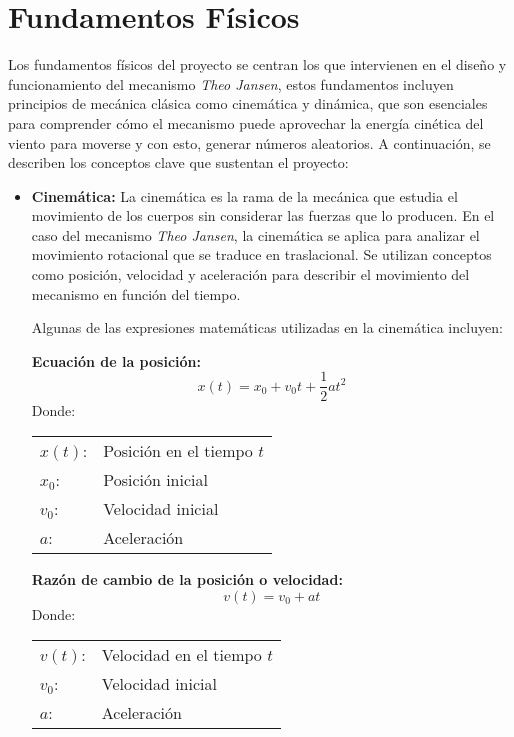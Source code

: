 \section{Fundamentos Físicos}

Los fundamentos físicos del proyecto se centran los que intervienen en el diseño y funcionamiento del mecanismo \textit{Theo Jansen}, estos fundamentos incluyen principios de mecánica clásica como cinemática y dinámica, que son esenciales para comprender cómo el mecanismo puede aprovechar la energía cinética del viento para moverse y con esto, generar números aleatorios. A continuación, se describen los conceptos clave que sustentan el proyecto:
\begin{itemize}
  \item \textbf{Cinemática:} La cinemática es la rama de la mecánica que estudia el movimiento de los cuerpos sin considerar las fuerzas que lo producen. En el caso del mecanismo \textit{Theo Jansen}, la cinemática se aplica para analizar el movimiento rotacional que se traduce en traslacional. Se utilizan conceptos como posición, velocidad y aceleración para describir el movimiento del mecanismo en función del tiempo.

  Algunas de las expresiones matemáticas utilizadas en la cinemática incluyen:

\textbf{Ecuación de la posición:}
\begin{equation}
x(t) = x_0 + v_0 t + \frac{1}{2} a t^2
\end{equation}
Donde: 

\begin{tabular}{@{}ll}
  \(x(t)\): & Posición en el tiempo \(t\) \\
  \(x_0\):  & Posición inicial \\
  \(v_0\):  & Velocidad inicial \\
  \(a\):    & Aceleración \\
\end{tabular}

\textbf{Razón de cambio de la posición o velocidad:}
\begin{equation}
v(t) = v_0 + a t
\end{equation}
Donde:

\begin{tabular}{@{}ll}
  \(v(t)\): & Velocidad en el tiempo \(t\) \\
  \(v_0\):  & Velocidad inicial \\
  \(a\):    & Aceleración \\
\end{tabular}


\end{itemize}

